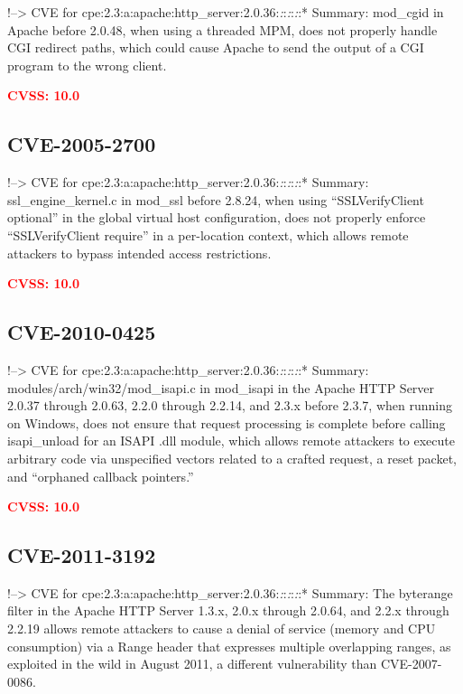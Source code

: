 \documentclass[a4paper, 12pt]{article}
\begin{document}
!--\textgreater{} CVE for
cpe:2.3:a:apache:http\_server:2.0.36:\emph{:}:\emph{:}:\emph{:}:*
Summary: mod\_cgid in Apache before 2.0.48, when using a threaded MPM,
does not properly handle CGI redirect paths, which could cause Apache to
send the output of a CGI program to the wrong client.

\textbf{\textcolor{red}{CVSS: 10.0}}

\hypertarget{cve-2005-2700}{%
\subsection{CVE-2005-2700}\label{cve-2005-2700}}

!--\textgreater{} CVE for
cpe:2.3:a:apache:http\_server:2.0.36:\emph{:}:\emph{:}:\emph{:}:*
Summary: ssl\_engine\_kernel.c in mod\_ssl before 2.8.24, when using
``SSLVerifyClient optional'' in the global virtual host configuration,
does not properly enforce ``SSLVerifyClient require'' in a per-location
context, which allows remote attackers to bypass intended access
restrictions.

\textbf{\textcolor{red}{CVSS: 10.0}}

\hypertarget{cve-2010-0425}{%
\subsection{CVE-2010-0425}\label{cve-2010-0425}}

!--\textgreater{} CVE for
cpe:2.3:a:apache:http\_server:2.0.36:\emph{:}:\emph{:}:\emph{:}:*
Summary: modules/arch/win32/mod\_isapi.c in mod\_isapi in the Apache
HTTP Server 2.0.37 through 2.0.63, 2.2.0 through 2.2.14, and 2.3.x
before 2.3.7, when running on Windows, does not ensure that request
processing is complete before calling isapi\_unload for an ISAPI .dll
module, which allows remote attackers to execute arbitrary code via
unspecified vectors related to a crafted request, a reset packet, and
``orphaned callback pointers.''

\textbf{\textcolor{red}{CVSS: 10.0}}

\hypertarget{cve-2011-3192}{%
\subsection{CVE-2011-3192}\label{cve-2011-3192}}

!--\textgreater{} CVE for
cpe:2.3:a:apache:http\_server:2.0.36:\emph{:}:\emph{:}:\emph{:}:*
Summary: The byterange filter in the Apache HTTP Server 1.3.x, 2.0.x
through 2.0.64, and 2.2.x through 2.2.19 allows remote attackers to
cause a denial of service (memory and CPU consumption) via a Range
header that expresses multiple overlapping ranges, as exploited in the
wild in August 2011, a different vulnerability than CVE-2007-0086.
\end{document}
